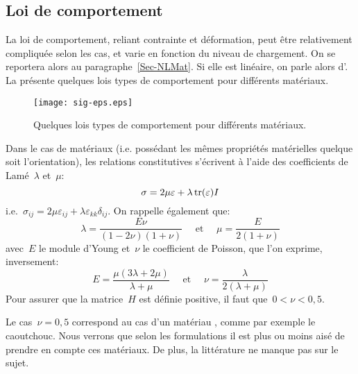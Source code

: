 \medskip
\subsection{Loi de comportement}\label{Sec-Loi}
La loi de comportement, reliant contrainte et déformation, peut être relativement compliquée selon les cas, et varie en fonction du niveau de chargement. On se reportera alors au paragraphe~\ref{Sec-NLMat}. Si elle est linéaire, on parle alors d'.
La  présente quelques lois types de comportement pour différents matériaux.
\begin{figure}[ht]
  \centerline{\texttt{[image: sig-eps.eps]}}
  \caption{\label{Fig-sig-eps} Quelques lois types de comportement pour différents matériaux.}
\end{figure}

\medskip
Dans le cas de matériaux  (i.e. possédant les mêmes propriétés matérielles quelque soit l'orientation), les relations constitutives s'écrivent à l'aide des coefficients de Lamé~$\lambda$ et~$\mu$:
\begin{equation}\sigma = 2\mu\varepsilon+\lambda \operatorname{tr}(\varepsilon)I\end{equation}
i.e.~$\sigma_{ij}=2\mu\varepsilon_{ij}+\lambda\varepsilon_{kk}\delta_{ij}$.
On rappelle également que:
\begin{equation}
\lambda=\dfrac{E\nu}{(1-2\nu)(1+\nu)}
\quad \text{ et } \quad 
\mu=\dfrac{E}{2(1+\nu)} 
\end{equation}
avec~$E$ le module d'Young et~$\nu$ le coefficient de Poisson, que l'on exprime, inversement:
\begin{equation}
E=\dfrac{\mu(3\lambda+2\mu)}{\lambda+\mu} \quad\text{ et }\quad
\nu=\dfrac{\lambda}{2(\lambda+\mu)}
\end{equation}
Pour assurer que la matrice~$H$ est définie positive, il faut que~$0<\nu<0,5$.

\medskip
Le cas~$\nu=0,5$ correspond au cas d'un matériau , comme par exemple le caoutchouc. Nous verrons que selon les formulations il est plus ou moins aisé de prendre en compte ces matériaux. De plus, la littérature ne manque pas sur le sujet.

